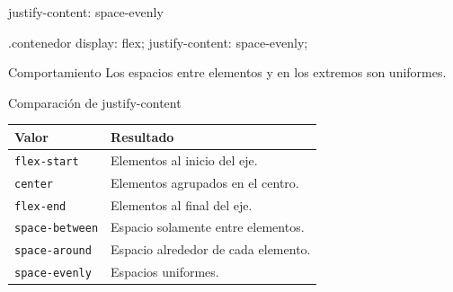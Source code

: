 \documentclass[aspectratio=169,11.5pt]{beamer}
\begin{document}
    \begin{frame}[fragile]{justify-content: space-evenly}
        \begin{csscodedark}
            .contenedor {
                display: flex;
                justify-content: space-evenly;
            }
        \end{csscodedark}

        \begin{center}
        \end{center}

        \begin{block}{Comportamiento}
            Los espacios entre elementos
            y en los extremos son uniformes.
        \end{block}
    \end{frame}

    \begin{frame}{Comparación de justify-content}
        \begin{center}
            \small
            \begin{tabular}{p{3.5cm}p{6.3cm}}
                \toprule
                \textbf{Valor} & \textbf{Resultado} \\
                \midrule

                \texttt{flex-start} &
                Elementos al inicio del eje. \\

                \texttt{center} &
                Elementos agrupados en el centro. \\

                \texttt{flex-end} &
                Elementos al final del eje. \\

                \texttt{space-between} &
                Espacio solamente entre elementos. \\

                \texttt{space-around} &
                Espacio alrededor de cada elemento. \\

                \texttt{space-evenly} &
                Espacios uniformes. \\

                \bottomrule
            \end{tabular}
        \end{center}
    \end{frame}
\end{document}
